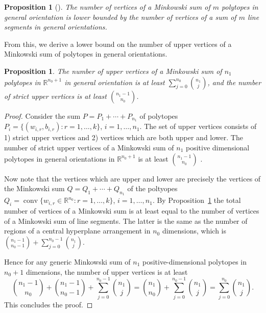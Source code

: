 \documentclass{article}
\newtheorem{proposition}[theorem]{Proposition}
\theoremstyle{definition}
\newcommand{\nin}{n_0}
\begin{document}
\begin{proposition}[{\citealt[Corollary 8.2]{adiprasito2017lefschetz}}]
\label{prop:shallow_bound}
    The number of vertices of a Minkowski sum of $m$ polytopes in general orientation is lower bounded by the number of vertices of a sum of $m$ line segments in general orientations. 
\end{proposition}

From this, we derive a lower bound on the number of upper vertices of a Minkowski sum of polytopes in general orientations. 

\begin{proposition}
\label{prop:lower-minkowski}
The number of upper vertices of a Minkowski sum of $n_1$ polytopes in $\mathbb{R}^{\nin+1}$ in general orientation is at least $\sum_{j=0}^{\nin}\binom{n_1}{j}$, and the number of strict upper vertices is at least $\binom{n_1-1}{ \nin}$. 
\end{proposition}

\begin{proof}
Consider the sum $P=P_1+\cdots+P_{n_1}$ of polytopes $P_i=\{(w_{i,r},b_{i,r})\colon r=1,\ldots, k\}$, $i=1,\ldots, n_1$.
The set of upper vertices consists of 1) strict upper vertices and 2) vertices which are both upper and lower.
The number of strict upper vertices of a Minkowski sum of $n_1$ positive dimensional polytopes in general orientations in $\mathbb{R}^{\nin+1}$ is at least $\binom{n_1-1}{ \nin}$  \cite[Corollary 3.8]{sharp2021}. 

Now note that the vertices which are upper and lower are precisely the vertices of the Minkowski sum $Q=Q_1+\cdots+Q_{n_1}$ of the poltyopes $Q_i = \operatorname{conv}\{w_{i,r}\in \mathbb{R}^{\nin}\colon r=1,\ldots, k\}$, $i=1,\ldots, n_1$.
By Proposition~\ref{prop:shallow_bound} the total number of vertices of a Minkowski sum is at least equal to the number of vertices of a Minkowski sum of line segments.
The latter is the same as the number of regions of a central hyperplane arrangement in $\nin$ dimensions, which is $\binom{n_1-1}{\nin-1} + \sum_{j=0}^{\nin-1}\binom{n_1}{j}$. 

Hence for any generic Minkowski sum of $n_1$ positive-dimensional polytopes in $\nin+1$ dimensions, the number of upper vertices is at least 
\begin{equation*} 
\binom{n_1-1}{ \nin} + \binom{n_1-1}{\nin-1} + \sum_{j=0}^{\nin-1}\binom{n_1}{j} 
= \binom{n_1}{ \nin}  + \sum_{j=0}^{\nin-1}\binom{n_1}{j} 
= \sum_{j=0}^{\nin}\binom{n_1}{j}. 
\end{equation*}
This concludes the proof.
\end{proof}
\end{document}
